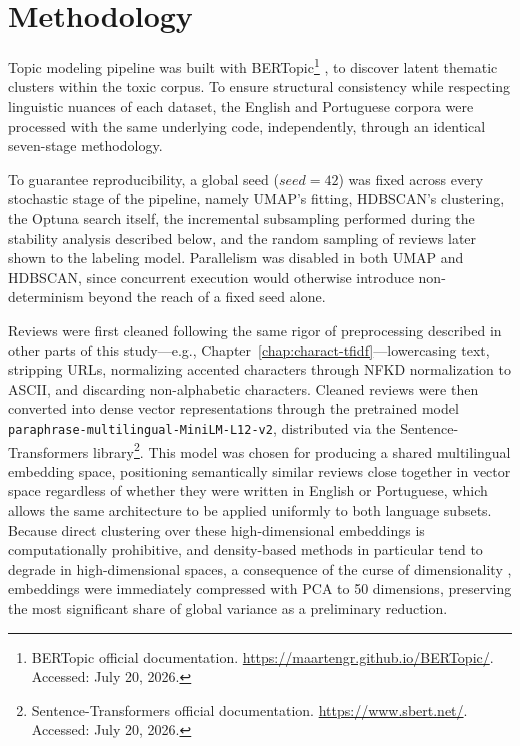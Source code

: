 
\section{Methodology}
\label{sec:semantic-method}

Topic modeling pipeline was built with BERTopic\footnote{BERTopic official documentation. \url{https://maartengr.github.io/BERTopic/}. Accessed: July 20, 2026.} \cite{grootendorst:2022}, to discover latent thematic clusters within the toxic corpus. To ensure structural consistency while respecting linguistic nuances of each dataset, the English and Portuguese corpora were processed with the same underlying code, independently, through an identical seven-stage methodology.

To guarantee reproducibility, a global seed ($seed = 42$) was fixed across every stochastic stage of the pipeline, namely UMAP's fitting, HDBSCAN's clustering, the Optuna search itself, the incremental subsampling performed during the stability analysis described below, and the random sampling of reviews later shown to the labeling model. Parallelism was disabled in both UMAP and HDBSCAN, since concurrent execution would otherwise introduce non-determinism beyond the reach of a fixed seed alone.

Reviews were first cleaned following the same rigor of preprocessing described in other parts of this study---e.g., Chapter~\ref{chap:charact-tfidf}---lowercasing text, stripping URLs, normalizing accented characters through NFKD normalization to ASCII, and discarding non-alphabetic characters. Cleaned reviews were then converted into dense vector representations through the pretrained model \texttt{paraphrase-multilingual-MiniLM-L12-v2}, distributed via the Sentence-Transformers library\footnote{Sentence-Transformers official documentation. \url{https://www.sbert.net/}. Accessed: July 20, 2026.}. This model was chosen for producing a shared multilingual embedding space, positioning semantically similar reviews close together in vector space regardless of whether they were written in English or Portuguese, which allows the same architecture to be applied uniformly to both language subsets. Because direct clustering over these high-dimensional embeddings is computationally prohibitive, and density-based methods in particular tend to degrade in high-dimensional spaces, a consequence of the curse of dimensionality \cite{bellman:1957,beyer:1999}, embeddings were immediately compressed with PCA to 50 dimensions, preserving the most significant share of global variance as a preliminary reduction.

